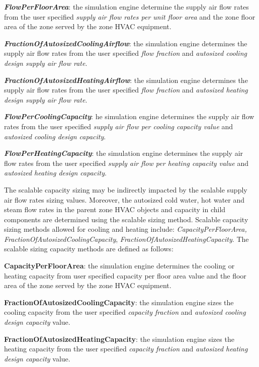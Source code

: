 \textbf{\emph{FlowPerFloorArea}}: the simulation engine determine the supply air flow rates from the user specified \emph{supply air flow rates per unit floor area} and the zone floor area of the zone served by the zone HVAC equipment.

\textbf{\emph{FractionOfAutosizedCoolingAirflow}}: the simulation engine determines the supply air flow rates from the user specified \emph{flow fraction} and \emph{autosized cooling design supply air flow rate}.

\textbf{\emph{FractionOfAutosizedHeatingAirflow}}: the simulation engine determines the supply air flow rates from the user specified \emph{flow fraction} and \emph{autosized heating design supply air flow rate}.

\textbf{\emph{FlowPerCoolingCapacity}}: he simulation engine determines the supply air flow rates from the user specified \emph{supply air flow per cooling capacity value} and \emph{autosized cooling design capacity}.

\textbf{\emph{FlowPerHeatingCapacity}}: the simulation engine determines the supply air flow rates from the user specified \emph{supply air flow per heating capacity value} and \emph{autosized heating design capacity}.

The scalable capacity sizing may be indirectly impacted by the scalable supply air flow rates sizing values. Moreover, the autosized cold water, hot water and steam flow rates in the parent zone HVAC objects and capacity in child components are determined using the scalable sizing method. Scalable capacity sizing methods allowed for cooling and heating include: \emph{CapacityPerFloorArea, FractionOfAutosizedCoolingCapacity}, \emph{FractionOfAutosizedHeatingCapacity}. The scalable sizing capacity methods are defined as follows:

\textbf{CapacityPerFloorArea}: the simulation engine determines the cooling or heating capacity from user specified capacity per floor area value and the floor area of the zone served by the zone HVAC equipment.

\textbf{FractionOfAutosizedCoolingCapacity}: the simulation engine sizes the cooling capacity from the user specified \emph{capacity fraction} and \emph{autosized cooling design capacity} value.

\textbf{FractionOfAutosizedHeatingCapacity}: the simulation engine sizes the heating capacity from the user specified \emph{capacity fraction} and \emph{autosized heating design capacity} value.
